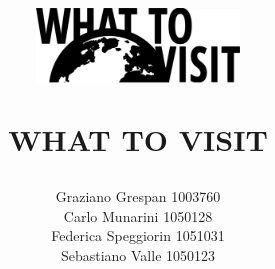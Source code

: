 \documentclass[
article,
10pt, %
oneside, %
BCOR5mm, %
]{scrartcl}
\begin{document}
\begin{center}
\title{
  \begin{figure}[h!]
  \centering
  \includegraphics[height=2cm,width=5.4cm]{images/WTV_logo.jpg}
  \end{figure}
  WHAT TO VISIT
}
\author{Graziano Grespan 1003760 \\
Carlo Munarini 1050128 \\
Federica Speggiorin 1051031 \\
Sebastiano Valle 1050123}
\end{center} %









\maketitle %

\setcounter{page}{1} %
\end{document}
